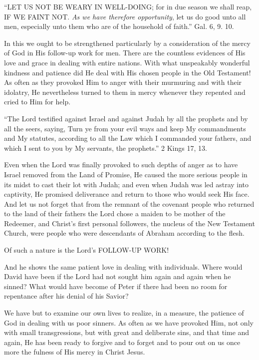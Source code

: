 \documentclass[
]{book}
\begin{document}
``LET US NOT BE WEARY IN WELL-DOING; for in due season we shall reap, IF WE FAINT NOT. \emph{As we have therefore opportunity}, let us do good unto all men, especially unto them who are of the household of faith.'' Gal. 6, 9. 10.

In this we ought to be strengthened particularly by a consideration of the mercy of God in His follow-up work for men. There are the countless evidences of His love and grace in dealing with entire nations. With what unspeakably wonderful kindness and patience did He deal with His chosen people in the Old Testament! As often as they provoked Him to anger with their murmuring and with their idolatry, He nevertheless turned to them in mercy whenever they repented and cried to Him for help.

``The Lord testified against Israel and against Judah by all the prophets and by all the seers, saying, Turn ye from your evil ways and keep My commandments and My statutes, according to all the Law which I commanded your fathers, and which I sent to you by My servants, the prophets.'' 2 Kings 17, 13.

Even when the Lord was finally provoked to such depths of anger as to have Israel removed from the Land of Promise, He caused the more serious people in its midst to cast their lot with Judah; and even when Judah was led astray into captivity, He promised deliverance and return to those who would seek His face. And let us not forget that from the remnant of the covenant people who returned to the land of their fathers the Lord chose a maiden to be mother of the Redeemer, and Christ's first personal followers, the nucleus of the New Testament Church, were people who were descendants of Abraham according to the flesh.

Of such a nature is the Lord's FOLLOW-UP WORK!

And he shows the same patient love in dealing with individuals. Where would David have been if the Lord had not sought him again and again when he sinned? What would have become of Peter if there had been no room for repentance after his denial of his Savior?

We have but to examine our own lives to realize, in a measure, the patience of God in dealing with us poor sinners. As often as we have provoked Him, not only with small transgressions, but with great and deliberate sins, and that time and again, He has been ready to forgive and to forget and to pour out on us once more the fulness of His mercy in Christ Jesus.
\end{document}
